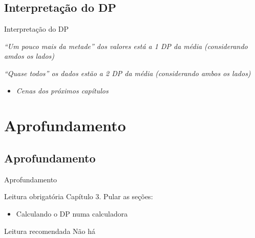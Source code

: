 \documentclass{beamer}
\begin{document}
\subsection{Interpretação do DP}

\begin{frame}{\scriptsize Interpretação do DP}
  \begin{block}{}
    \footnotesize
    {\em ``Um pouco mais da metade'' dos valores está a 1 DP da média (considerando amdos os lados)}
  \end{block}
  \begin{block}{}
    \footnotesize
    {\em ``Quase todos'' os dados estão a 2 DP da média (considerando ambos os lados)}
  \end{block}
  \begin{itemize}
    \footnotesize
  \item {\em Cenas dos próximos capítulos}
  \end{itemize}
\end{frame}

\section{Aprofundamento}

\subsection{Aprofundamento}

\begin{frame}{\scriptsize Aprofundamento}
  \begin{block}{Leitura obrigatória}
    \footnotesize
    Capítulo 3. Pular as seções:
    \begin{itemize}
      \footnotesize
    \item Calculando o DP numa calculadora
    \end{itemize}
  \end{block}
  \begin{block}{Leitura recomendada}
    \scriptsize
    Não há
  \end{block}
\end{frame}
\end{document}
